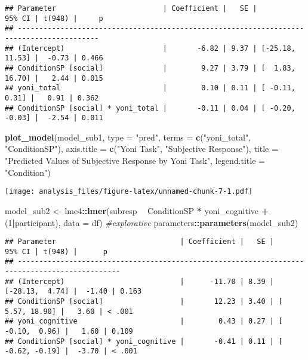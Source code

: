 \documentclass[
]{article}
\newenvironment{Shaded}{\begin{snugshade}}{\end{snugshade}}
\newcommand{\CommentTok}[1]{\textcolor[rgb]{0.56,0.35,0.01}{\textit{#1}}}
\newcommand{\DataTypeTok}[1]{\textcolor[rgb]{0.13,0.29,0.53}{#1}}
\newcommand{\DecValTok}[1]{\textcolor[rgb]{0.00,0.00,0.81}{#1}}
\newcommand{\KeywordTok}[1]{\textcolor[rgb]{0.13,0.29,0.53}{\textbf{#1}}}
\newcommand{\NormalTok}[1]{#1}
\newcommand{\OperatorTok}[1]{\textcolor[rgb]{0.81,0.36,0.00}{\textbf{#1}}}
\newcommand{\StringTok}[1]{\textcolor[rgb]{0.31,0.60,0.02}{#1}}
\begin{document}
\begin{verbatim}
## Parameter                         | Coefficient |   SE |          95% CI | t(948) |     p
## -----------------------------------------------------------------------------------------
## (Intercept)                       |       -6.82 | 9.37 | [-25.18, 11.53] |  -0.73 | 0.466
## ConditionSP [social]              |        9.27 | 3.79 | [  1.83, 16.70] |   2.44 | 0.015
## yoni_total                        |        0.10 | 0.11 | [ -0.11,  0.31] |   0.91 | 0.362
## ConditionSP [social] * yoni_total |       -0.11 | 0.04 | [ -0.20, -0.03] |  -2.54 | 0.011
\end{verbatim}

\begin{Shaded}
\begin{Highlighting}[]
\KeywordTok{plot_model}\NormalTok{(model_sub1, }\DataTypeTok{type =} \StringTok{"pred"}\NormalTok{, }\DataTypeTok{terms =} \KeywordTok{c}\NormalTok{(}\StringTok{"yoni_total"}\NormalTok{, }\StringTok{"ConditionSP"}\NormalTok{), }\DataTypeTok{axis.title =} \KeywordTok{c}\NormalTok{(}\StringTok{"Yoni Task"}\NormalTok{, }\StringTok{"Subjective Response"}\NormalTok{), }\DataTypeTok{title =} \StringTok{"Predicted Values of Subjective Response by Yoni Task"}\NormalTok{, }\DataTypeTok{legend.title =} \StringTok{"Condition"}\NormalTok{)}
\end{Highlighting}
\end{Shaded}

\texttt{[image: analysis\_files/figure-latex/unnamed-chunk-7-1.pdf]}

\begin{Shaded}
\begin{Highlighting}[]
\NormalTok{model_sub2 <-}\StringTok{ }\NormalTok{lme4}\OperatorTok{::}\KeywordTok{lmer}\NormalTok{(subresp }\OperatorTok{~}\StringTok{ }\NormalTok{ConditionSP }\OperatorTok{*}\StringTok{ }\NormalTok{yoni_cognitive }\OperatorTok{+}\StringTok{ }\NormalTok{(}\DecValTok{1}\OperatorTok{|}\NormalTok{participant), }\DataTypeTok{data =}\NormalTok{ df)  }\CommentTok{#explorative}
\NormalTok{parameters}\OperatorTok{::}\KeywordTok{parameters}\NormalTok{(model_sub2)}
\end{Highlighting}
\end{Shaded}

\begin{verbatim}
## Parameter                             | Coefficient |   SE |          95% CI | t(948) |      p
## ----------------------------------------------------------------------------------------------
## (Intercept)                           |      -11.70 | 8.39 | [-28.13,  4.74] |  -1.40 | 0.163 
## ConditionSP [social]                  |       12.23 | 3.40 | [  5.57, 18.90] |   3.60 | < .001
## yoni_cognitive                        |        0.43 | 0.27 | [ -0.10,  0.96] |   1.60 | 0.109 
## ConditionSP [social] * yoni_cognitive |       -0.41 | 0.11 | [ -0.62, -0.19] |  -3.70 | < .001
\end{verbatim}
\end{document}
